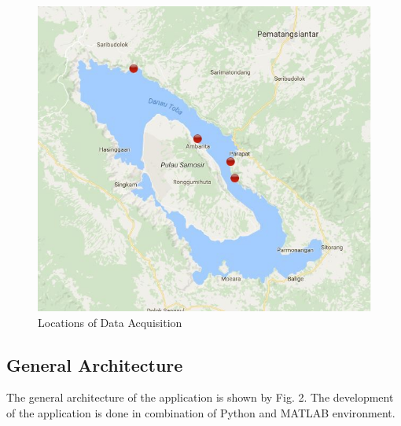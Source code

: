 \documentclass[journal,comsoc]{IEEEtran}
\let\MYoriglatexcaption\caption
\renewcommand{\caption}[2][\relax]{\MYoriglatexcaption[#2]{#2}}
\begin{document}
\begin{figure}[!th]
\centering
\includegraphics[scale=0.2]{map_data_acquisition.jpg}
\caption{Locations of Data Acquisition \cite{Rahmat16}}
\label{fig1}
\end{figure}

\subsection{General Architecture}

The general architecture of the application is shown by Fig. 2. The development of the application is done in combination of Python and MATLAB environment.
\end{document}

